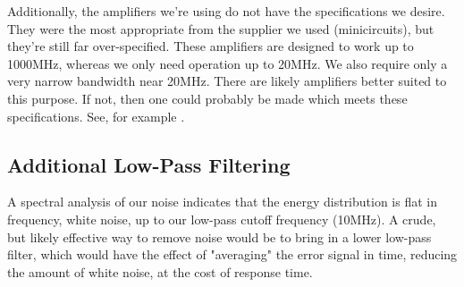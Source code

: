 Additionally, the amplifiers we're using do not have the specifications we desire.  They were the most appropriate from the supplier we used (minicircuits), but they're still far over-specified.  These amplifiers are designed to work up to 1000MHz, whereas we only need operation up to 20MHz.  We also require only a very narrow bandwidth near 20MHz.  There are likely amplifiers better suited to this purpose.  If not, then one could probably be made which meets these specifications.  See, for example \cite{ti_amps}.

\subsection{Additional Low-Pass Filtering}

A spectral analysis of our noise indicates that the energy distribution is flat in frequency, white noise, up to our low-pass cutoff frequency (10MHz).  A crude, but likely effective way to remove noise would be to bring in a lower low-pass filter, which would have the effect of "averaging" the error signal in time, reducing the amount of white noise, at the cost of response time.



